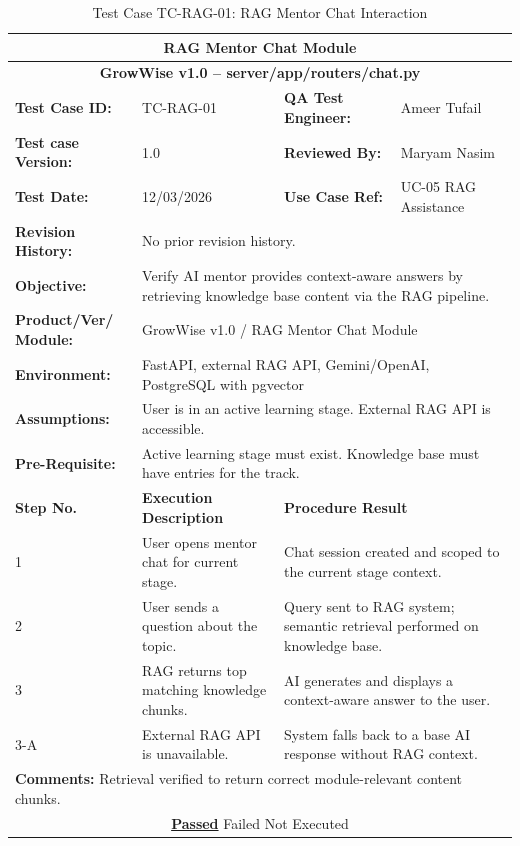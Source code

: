 \documentclass{FastFyp}
\begin{document}
\begin{table}[H]
\footnotesize
\centering
\caption{Test Case TC-RAG-01: RAG Mentor Chat Interaction}
\label{tab:tcrag}
\begin{tabular}{|p{2.5cm}|p{4cm}|p{2.5cm}|p{4.5cm}|}
\hline
\multicolumn{4}{|c|}{\textbf{RAG Mentor Chat Module}} \\ \hline
\multicolumn{4}{|c|}{\textbf{GrowWise v1.0 -- server/app/routers/chat.py}} \\ \hline
\textbf{Test Case ID:} & TC-RAG-01 & \textbf{QA Test Engineer:} & Ameer Tufail \\ \hline
\textbf{Test case Version:} & 1.0 & \textbf{Reviewed By:} & Maryam Nasim \\ \hline
\textbf{Test Date:} & 12/03/2026 & \textbf{Use Case Ref:} & UC-05 RAG Assistance \\ \hline
\textbf{Revision History:} & \multicolumn{3}{p{11cm}|}{No prior revision history.} \\ \hline
\textbf{Objective:} & \multicolumn{3}{p{11cm}|}{Verify AI mentor provides context-aware answers by retrieving knowledge base content via the RAG pipeline.} \\ \hline
\textbf{Product/Ver/ Module:} & \multicolumn{3}{p{11cm}|}{GrowWise v1.0 / RAG Mentor Chat Module} \\ \hline
\textbf{Environment:} & \multicolumn{3}{p{11cm}|}{FastAPI, external RAG API, Gemini/OpenAI, PostgreSQL with pgvector} \\ \hline
\textbf{Assumptions:} & \multicolumn{3}{p{11cm}|}{User is in an active learning stage. External RAG API is accessible.} \\ \hline
\textbf{Pre-Requisite:} & \multicolumn{3}{p{11cm}|}{Active learning stage must exist. Knowledge base must have entries for the track.} \\ \hline
\textbf{Step No.} & \textbf{Execution Description} & \multicolumn{2}{p{7cm}|}{\textbf{Procedure Result}} \\ \hline
1 & User opens mentor chat for current stage. & \multicolumn{2}{p{7cm}|}{Chat session created and scoped to the current stage context.} \\ \hline
2 & User sends a question about the topic. & \multicolumn{2}{p{7cm}|}{Query sent to RAG system; semantic retrieval performed on knowledge base.} \\ \hline
3 & RAG returns top matching knowledge chunks. & \multicolumn{2}{p{7cm}|}{AI generates and displays a context-aware answer to the user.} \\ \hline
3-A & External RAG API is unavailable. & \multicolumn{2}{p{7cm}|}{System falls back to a base AI response without RAG context.} \\ \hline
\multicolumn{4}{|p{13.5cm}|}{\textbf{Comments:} Retrieval verified to return correct module-relevant content chunks.} \\ \hline
\multicolumn{4}{|c|}{\underline{\textbf{Passed}} \quad\quad\quad Failed \quad\quad\quad Not Executed} \\ \hline
\end{tabular}
\end{table}
\end{document}
